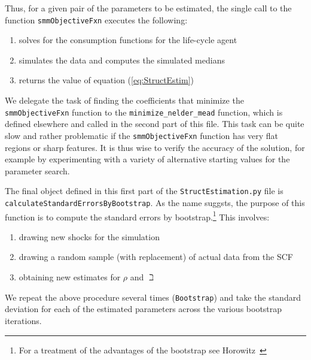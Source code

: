 \documentclass[titlepage, headings=optiontotocandhead]{econtex}
\begin{document}

Thus, for a given pair of the parameters to be estimated, the single
call to the function \texttt{smmObjectiveFxn} executes the following:
\begin{enumerate}
\item solves for the consumption functions for the life-cycle agent
\item simulates the data and computes the simulated medians
\item returns the value of equation (\ref{eq:StructEstim})
\end{enumerate}

We delegate the task of finding the coefficients that minimize the \texttt{smmObjectiveFxn} function to the \texttt{minimize\_nelder\_mead} function, which is defined elsewhere and called in the second part of this file.  This task can be quite slow and rather problematic if the \texttt{smmObjectiveFxn} function has very flat regions or sharp features. It is thus wise to verify the accuracy of the solution, for example by experimenting with a variety of alternative starting values for the parameter search.

The final object defined in this first part of the \texttt{StructEstimation.py}
file is \texttt{calculateStandardErrorsByBootstrap}. As the name suggsts, the
purpose of this function is to compute the standard errors by bootstrap.\footnote{For a
  treatment of the advantages of the bootstrap see
  Horowitz~\citeyearpar{horowitzBootstrap}} This involves:
\begin{enumerate}
\item drawing new shocks for the simulation
\item drawing a random sample (with replacement) of actual data from the SCF
\item obtaining new estimates for $\rho$ and $\beth$
\end{enumerate}
We repeat the above procedure several times (\texttt{Bootstrap}) and
take the standard deviation for each of the estimated parameters across the various bootstrap iterations.
\end{document}
